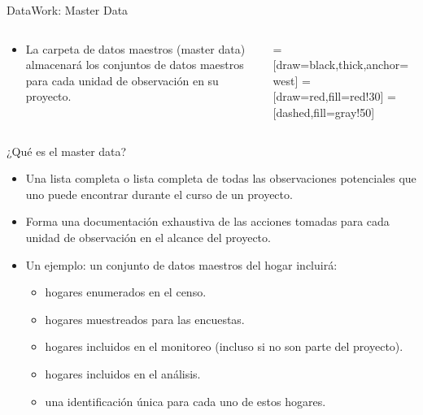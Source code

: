 \documentclass[11pt, aspectratio=169, compress]{beamer}
\begin{document}
\begin{frame}[t]{DataWork: Master Data}
	\begin{columns}
		\begin{column}{0.5\textwidth}
		   \begin{itemize}
			   \item La carpeta de datos maestros (master data) almacenará los conjuntos de datos maestros para cada unidad de observación en su proyecto.
		   \end{itemize}
		\end{column}
		\begin{column}{0.5\textwidth} 
			=[draw=black,thick,anchor=west]
			=[draw=red,fill=red!30]
			=[dashed,fill=gray!50]
		\end{column}
	\end{columns}
\end{frame}
\begin{frame}{¿Qué es el master data?}
	\begin{itemize}
		\item Una lista completa o lista completa de todas las observaciones potenciales que uno puede encontrar durante el curso de un proyecto.
		\item Forma una documentación exhaustiva de las acciones tomadas para cada unidad de observación en el alcance del proyecto.
		\item Un ejemplo: un conjunto de datos maestros del hogar incluirá:
		\begin{itemize}
			\item hogares enumerados en el censo.
			\item hogares muestreados para las encuestas.
			\item hogares incluidos en el monitoreo (incluso si no son parte del proyecto).
			\item hogares incluidos en el análisis.
			\item una identificación única para cada uno de estos hogares.
		\end{itemize}
	\end{itemize}
\end{frame}
\end{document}
